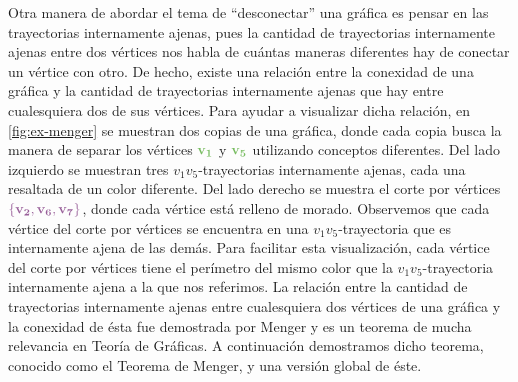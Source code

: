 Otra manera de abordar el tema de ``desconectar'' una gr\'afica es  pensar en
las trayectorias internamente ajenas, pues la cantidad de trayectorias
internamente ajenas entre dos v\'ertices nos habla de cu\'antas maneras
diferentes hay de conectar un v\'ertice con otro. De hecho, existe una
relaci\'on entre la conexidad de una gr\'afica y la cantidad de trayectorias
internamente ajenas que hay entre cualesquiera dos de sus v\'ertices. Para
ayudar a visualizar dicha relaci\'on, en \cref{fig:ex-menger} se muestran dos
copias de una gr\'afica, donde cada copia busca la manera de separar los
v\'ertices $\color{verde} \bf v_1$ y $\color{verde} \bf v_5$ utilizando
conceptos diferentes. Del lado izquierdo se muestran tres $v_1v_5$-trayectorias
internamente ajenas, cada una resaltada de un color diferente. Del lado derecho
se muestra el corte por v\'ertices ${\color{morado}\bf \{v_2, v_6, v_7\} }$,
donde cada v\'ertice est\'a relleno de morado. Observemos que cada v\'ertice del
corte por v\'ertices se encuentra en una $v_1v_5$-trayectoria que es
internamente ajena de las dem\'as. Para facilitar esta visualizaci\'on, cada
v\'ertice del corte por v\'ertices tiene el per\'imetro del mismo color que la
$v_1v_5$-trayectoria internamente ajena a la que nos referimos. La relaci\'on
entre la cantidad de trayectorias internamente ajenas entre cualesquiera dos
v\'ertices de una gr\'afica y la conexidad de \'esta fue demostrada por Menger y
es un teorema de mucha relevancia en Teor\'ia de Gr\'aficas. A continuaci\'on
demostramos dicho teorema, conocido como el Teorema de Menger, y una versi\'on
global de \'este. 

